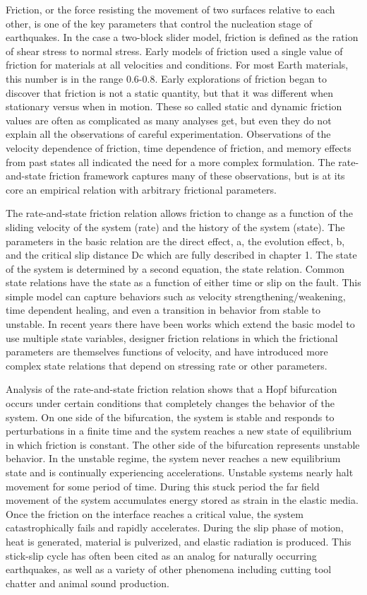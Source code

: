 Friction, or the force resisting the movement of two surfaces relative to each other, is one of the key parameters that control the nucleation stage of earthquakes. In the case a two-block slider model, friction is defined as the ration of shear stress to normal stress. Early models of friction used a single value of friction for materials at all velocities and conditions. For most Earth materials, this number is in the range 0.6-0.8. Early explorations of friction began to discover that friction is not a static quantity, but that it was different when stationary versus when in motion. These so called static and dynamic friction values are often as complicated as many analyses get, but even they do not explain all the observations of careful experimentation. Observations of the velocity dependence of friction, time dependence of friction, and memory effects from past states all indicated the need for a more complex formulation. The rate-and-state friction framework captures many of these observations, but is at its core an empirical relation with arbitrary frictional parameters.

The rate-and-state friction relation allows friction to change as a function of the sliding velocity of the system (rate) and the history of the system (state). The parameters in the basic relation are the direct effect, a, the evolution effect, b, and the critical slip distance Dc which are fully described in chapter 1. The state of the system is determined by a second equation, the state relation. Common state relations have the state as a function of either time or slip on the fault. This simple model can capture behaviors such as velocity strengthening/weakening, time dependent healing, and even a transition in behavior from stable to unstable. In recent years there have been works which extend the basic model to use multiple state variables, designer friction relations in which the frictional parameters are themselves functions of velocity, and have introduced more complex state relations that depend on stressing rate or other parameters.

Analysis of the rate-and-state friction relation shows that a Hopf bifurcation occurs under certain conditions that completely changes the behavior of the system. On one side of the bifurcation, the system is stable and responds to perturbations in a finite time and the system reaches a new state of equilibrium in which friction is constant. The other side of the bifurcation represents unstable behavior. In the unstable regime, the system never reaches a new equilibrium state and is continually experiencing accelerations. Unstable systems nearly halt movement for some period of time. During this stuck period the far field movement of the system accumulates energy stored as strain in the elastic media. Once the friction on the interface reaches a critical value, the system catastrophically fails and rapidly accelerates. During the slip phase of motion, heat is generated, material is pulverized, and elastic radiation is produced. This stick-slip cycle has often been cited as an analog for naturally occurring earthquakes, as well as a variety of other phenomena including cutting tool chatter and animal sound production.

